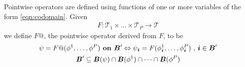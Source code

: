 \documentclass[12pt]{article}
\begin{document}
Pointwise operators are defined using functions of one or more variables of the form \eqref{eqn:codomain}. Given 
\begin{gather*}
F: \mathcal{T}_1 \times \dots \times \mathcal{T}_P \rightarrow \mathcal{T}
\end{gather*}
we define $F@$, the pointwise operator derived from $F$, to be 
\begin{gather*}
\psi = F@(\phi^1 , \dots, \phi^P) \hbox{\bf{ on }} {\boldsymbol{B}}' \Leftrightarrow 
\psi_{\boldsymbol{i}} = F(\phi^1_{\boldsymbol{i}}, \dots , \phi^P_{\boldsymbol{i}}) \hbox{ , } {\boldsymbol{i}} \in {\boldsymbol{B}}'\\
{\boldsymbol{B}}' \subseteq {\boldsymbol{B}}(\psi) \cap {\boldsymbol{B}}(\phi^1) \cap \dots \cap {\boldsymbol{B}}(\phi^P)
\end{gather*}



%
%
%
%
\end{document}
